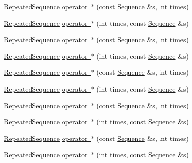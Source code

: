 \begin{DoxyCompactItemize}
\item 
\mbox{\hyperlink{classfakeit_1_1RepeatedSequence}{Repeated\+Sequence}} \mbox{\hyperlink{classfakeit_1_1RepeatedSequence_ab856dedd10fec617583599e03f3c9a80}{operator $\ast$}} (const \mbox{\hyperlink{classfakeit_1_1Sequence}{Sequence}} \&s, int times)
\item 
\mbox{\hyperlink{classfakeit_1_1RepeatedSequence}{Repeated\+Sequence}} \mbox{\hyperlink{classfakeit_1_1RepeatedSequence_ae695b1e2c0f00bc6b9a49dd1efcb8f7b}{operator $\ast$}} (int times, const \mbox{\hyperlink{classfakeit_1_1Sequence}{Sequence}} \&s)
\item 
\mbox{\hyperlink{classfakeit_1_1RepeatedSequence}{Repeated\+Sequence}} \mbox{\hyperlink{classfakeit_1_1RepeatedSequence_ab856dedd10fec617583599e03f3c9a80}{operator $\ast$}} (const \mbox{\hyperlink{classfakeit_1_1Sequence}{Sequence}} \&s, int times)
\item 
\mbox{\hyperlink{classfakeit_1_1RepeatedSequence}{Repeated\+Sequence}} \mbox{\hyperlink{classfakeit_1_1RepeatedSequence_ae695b1e2c0f00bc6b9a49dd1efcb8f7b}{operator $\ast$}} (int times, const \mbox{\hyperlink{classfakeit_1_1Sequence}{Sequence}} \&s)
\item 
\mbox{\hyperlink{classfakeit_1_1RepeatedSequence}{Repeated\+Sequence}} \mbox{\hyperlink{classfakeit_1_1RepeatedSequence_ab856dedd10fec617583599e03f3c9a80}{operator $\ast$}} (const \mbox{\hyperlink{classfakeit_1_1Sequence}{Sequence}} \&s, int times)
\item 
\mbox{\hyperlink{classfakeit_1_1RepeatedSequence}{Repeated\+Sequence}} \mbox{\hyperlink{classfakeit_1_1RepeatedSequence_ae695b1e2c0f00bc6b9a49dd1efcb8f7b}{operator $\ast$}} (int times, const \mbox{\hyperlink{classfakeit_1_1Sequence}{Sequence}} \&s)
\item 
\mbox{\hyperlink{classfakeit_1_1RepeatedSequence}{Repeated\+Sequence}} \mbox{\hyperlink{classfakeit_1_1RepeatedSequence_ab856dedd10fec617583599e03f3c9a80}{operator $\ast$}} (const \mbox{\hyperlink{classfakeit_1_1Sequence}{Sequence}} \&s, int times)
\item 
\mbox{\hyperlink{classfakeit_1_1RepeatedSequence}{Repeated\+Sequence}} \mbox{\hyperlink{classfakeit_1_1RepeatedSequence_ae695b1e2c0f00bc6b9a49dd1efcb8f7b}{operator $\ast$}} (int times, const \mbox{\hyperlink{classfakeit_1_1Sequence}{Sequence}} \&s)
\item 
\mbox{\hyperlink{classfakeit_1_1RepeatedSequence}{Repeated\+Sequence}} \mbox{\hyperlink{classfakeit_1_1RepeatedSequence_ab856dedd10fec617583599e03f3c9a80}{operator $\ast$}} (const \mbox{\hyperlink{classfakeit_1_1Sequence}{Sequence}} \&s, int times)
\item 
\mbox{\hyperlink{classfakeit_1_1RepeatedSequence}{Repeated\+Sequence}} \mbox{\hyperlink{classfakeit_1_1RepeatedSequence_ae695b1e2c0f00bc6b9a49dd1efcb8f7b}{operator $\ast$}} (int times, const \mbox{\hyperlink{classfakeit_1_1Sequence}{Sequence}} \&s)
\end{DoxyCompactItemize}


